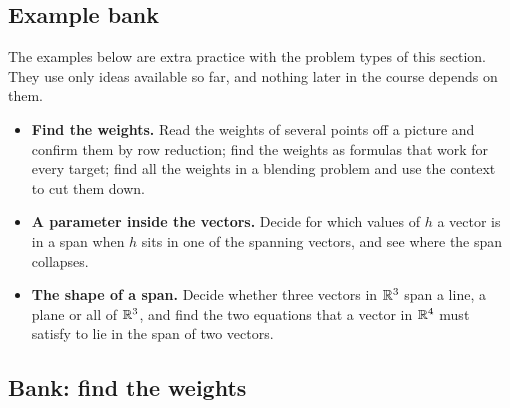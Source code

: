 \documentclass[11pt]{article}
\begin{document}
\subsection*{Example bank}

The examples below are extra practice with the problem types of this section. They use only ideas available so far, and nothing later in the course depends on them.

\begin{remark}
\begin{itemize}
  \item \textbf{Find the weights.} Read the weights of several points off a picture and confirm them by row reduction; find the weights as formulas that work for every target; find all the weights in a blending problem and use the context to cut them down.
  \item \textbf{A parameter inside the vectors.} Decide for which values of $h$ a vector is in a span when $h$ sits in one of the spanning vectors, and see where the span collapses.
  \item \textbf{The shape of a span.} Decide whether three vectors in $\mathbb{R}^3$ span a line, a plane or all of $\mathbb{R}^3$, and find the two equations that a vector in $\mathbb{R}^4$ must satisfy to lie in the span of two vectors.
\end{itemize}
\end{remark}

\subsection*{Bank: find the weights}
\end{document}

